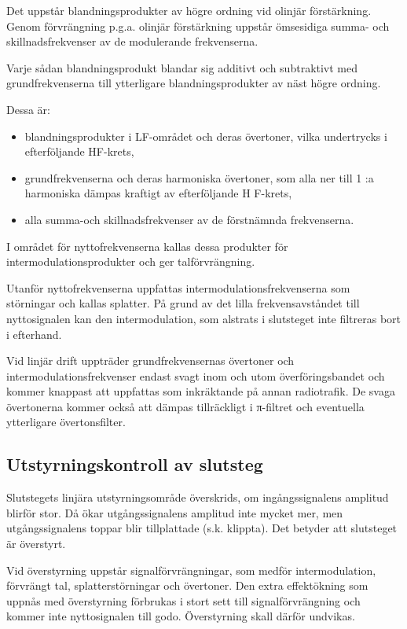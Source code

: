 Det uppstår blandningsprodukter av högre ordning vid olinjär
förstärkning. Genom förvrängning p.g.a. olinjär förstärkning uppstår
ömsesidiga summa- och skillnadsfrekvenser av de modulerande
frekvenserna.

Varje sådan blandningsprodukt blandar sig additivt och subtraktivt med
grundfrekvenserna till ytterligare blandningsprodukter av näst högre
ordning.

Dessa är:
\begin{itemize}
\item blandningsprodukter i LF-området och deras övertoner, vilka
  undertrycks i efterföljande HF-krets,

\item grundfrekvenserna och deras harmoniska övertoner, som alla ner
  till 1 :a harmoniska dämpas kraftigt av efterföljande H F-krets,

\item alla summa-och skillnadsfrekvenser av de förstnämnda frekvenserna.
\end{itemize}

I området för nyttofrekvenserna kallas dessa produkter för
intermodulationsprodukter och ger talförvrängning.

Utanför nyttofrekvenserna uppfattas intermodulationsfrekvenserna som
störningar och kallas splatter. På grund av det lilla
frekvensavståndet till nyttosignalen kan den intermodulation, som
alstrats i slutsteget inte filtreras bort i efterhand.

Vid linjär drift uppträder grundfrekvensernas övertoner och
intermodulationsfrekvenser endast svagt inom och utom
överföringsbandet och kommer knappast att uppfattas som inkräktande på
annan radiotrafik.  De svaga övertonerna kommer också att dämpas
tillräckligt i π-filtret och eventuella ytterligare övertonsfilter.


\subsection{Utstyrningskontroll av slutsteg}

Slutstegets linjära utstyrningsområde överskrids, om ingångssignalens
amplitud blirför stor. Då ökar utgångssignalens amplitud inte mycket
mer, men utgångssignalens toppar blir tillplattade (s.k. klippta). Det
betyder att slutsteget är överstyrt.

Vid överstyrning uppstår signalförvrängningar, som medför
intermodulation, förvrängt tal, splatterstörningar och övertoner.  Den
extra effektökning som uppnås med överstyrning förbrukas i stort sett
till signalförvrängning och kommer inte nyttosignalen till
godo. Överstyrning skall därför undvikas.

